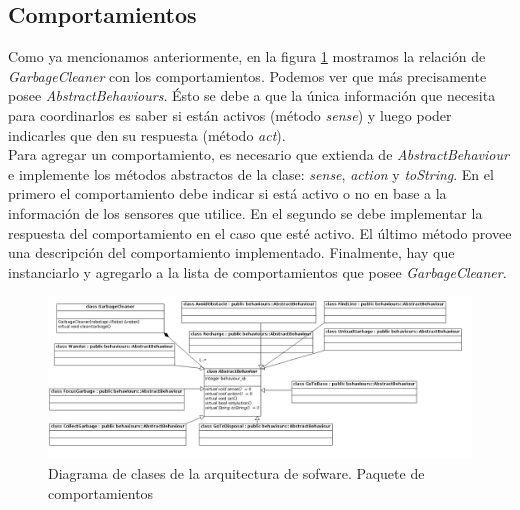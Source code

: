 \subsection{Comportamientos}
Como ya mencionamos anteriormente, en la figura \ref{fig:soft_arq_behaviours} mostramos la
relaci\'on de \textit{GarbageCleaner} con los comportamientos. Podemos ver que m\'as precisamente posee
 \textit{AbstractBehaviours}. \'Esto se debe a que la \'unica informaci\'on que necesita para coordinarlos
es saber si est\'an activos (m\'etodo \textit{sense}) y luego poder indicarles que den su respuesta
(m\'etodo \textit{act}).
\\\indent
Para agregar un comportamiento, es necesario que extienda de \textit{AbstractBehaviour} e implemente
los m\'etodos abstractos de la clase: \textit{sense}, \textit{action} y \textit{toString}. En el primero el comportamiento
debe indicar si est\'a activo o no en base a la informaci\'on de los sensores que utilice. En el
segundo se debe implementar la respuesta del comportamiento en el caso que est\'e activo. El
\'ultimo m\'etodo provee una descripci\'on del comportamiento implementado. Finalmente, hay
que instanciarlo y agregarlo a la lista de comportamientos que posee \textit{GarbageCleaner}.
\begin{landscape}
\begin{figure}[h]
	\centering
	\includegraphics[scale=0.52]{comportamientos/figures/api1.png}
	\caption[Arquitectura de software: comportamientos]{Diagrama de clases de la arquitectura
			de sofware. Paquete de comportamientos}
	\label{fig:soft_arq_behaviours}
\end{figure}
\end{landscape}

